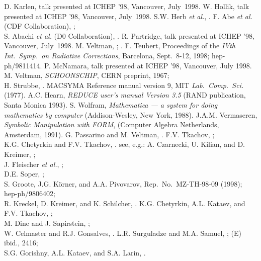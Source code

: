  D. Karlen, talk presented at ICHEP '98, Vancouver, July~1998.
 W. Hollik, talk presented at ICHEP '98, Vancouver, July~1998.
  S.W. Herb {\it et al.}, .
  F. Abe {\it et al.} (CDF Collaboration), ;\\
  S. Abachi {\it et al.} (D0 Collaboration), .
  R. Partridge, talk presented at ICHEP '98, Vancouver, July~1998.
  M. Veltman, ; .
  F. Teubert, Proceedings of the {\it IVth Int.\ Symp.\ on
    Radiative Corrections}, Barcelona, Sept.~8-12, 1998; hep-ph/9811414.
  P. McNamara, talk presented at ICHEP '98, Vancouver, July 1998.
  M. Veltman, {\it SCHOONSCHIP}, CERN preprint,
  1967;\\ H. Strubbe, .
 MACSYMA Reference manual version 9, MIT {\it
    Lab.~Comp.~Sci.} (1977).
 A.C. Hearn, {\it REDUCE user's manual Version 3.5}
  (RAND publication, Santa Monica 1993).
  S. Wolfram, {\it Mathematica --- a system for doing
    mathematics by computer} (Addison-Wesley, New York, 1988).
  J.A.M. Vermaseren, {\it Symbolic Manipulation with FORM},
  (Computer Algebra Netherlands, Amsterdam, 1991).
 G. Passarino and M. Veltman, .
  F.V. Tkachov, ;\\
  K.G. Chetyrkin and F.V. Tkachov, .
 see, e.g.:
A. Czarnecki, U. Kilian, and D. Kreimer, ;\\
J. Fleischer {\it et al.}, ;\\
D.E. Soper, ;\\
S. Groote, J.G. K\"orner, and A.A. Pivovarov, Rep.~No.~MZ-TH-98-09 (1998);
hep-ph/9806402;\\
R. Kreckel, D. Kreimer, and K. Schilcher, .
  K.G. Chetyrkin, A.L. Kataev, and F.V. Tkachov, ;\\
  M. Dine and J. Sapirstein, ;\\
  W. Celmaster and R.J. Gonsalves, .
  L.R. Surguladze and M.A. Samuel, ; (E) ibid., 2416;\\
  S.G. Gorishny, A.L. Kataev, and S.A. Larin, .
